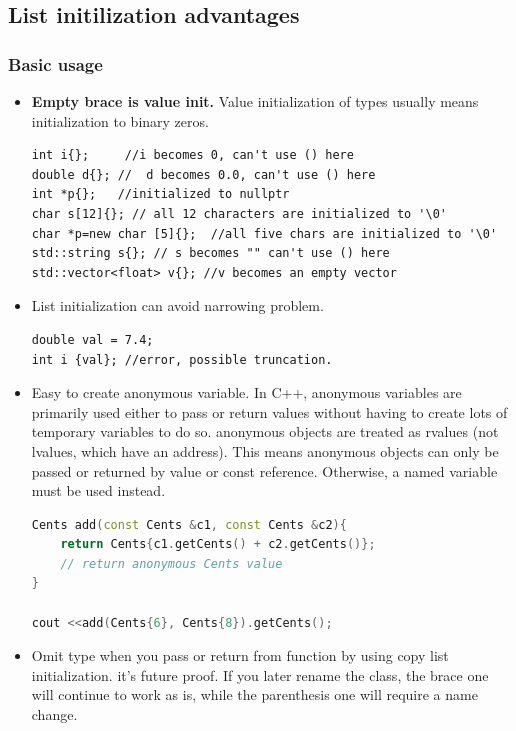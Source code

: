 \documentclass[a4paper,11pt,twoside]{book}
\begin{document}
\subsection{List initilization advantages}
			 

\subsubsection{Basic usage}
\begin{itemize}
	
	 \item \textbf{Empty brace is value init.} Value initialization of types usually means initialization to binary zeros.
\begin{lstlisting}[numbers = none]
int i{};     //i becomes 0, can't use () here         
double d{}; //  d becomes 0.0, can't use () here        
int *p{};   //initialized to nullptr
char s[12]{}; // all 12 characters are initialized to '\0'
char *p=new char [5]{};  //all five chars are initialized to '\0'		
std::string s{}; // s becomes "" can't use () here  
std::vector<float> v{}; //v becomes an empty vector
\end{lstlisting}

    \item List initialization can avoid narrowing problem.
\begin{lstlisting}[numbers=none]
double val = 7.4;
int i {val}; //error, possible truncation.
\end{lstlisting}

    \item Easy to create anonymous variable. In C++, anonymous variables are primarily used either to pass or return values without having to create lots of temporary variables to do so. anonymous objects are treated as rvalues (not lvalues, which have an address). This means anonymous objects can only be passed or returned by value or const reference. Otherwise, a named variable must be used instead.

\begin{lstlisting}[frame=single, language=c++]
Cents add(const Cents &c1, const Cents &c2){
	return Cents{c1.getCents() + c2.getCents()};
	// return anonymous Cents value
}

cout <<add(Cents{6}, Cents{8}).getCents();
\end{lstlisting}

    \item Omit type when you pass or return from function by using copy list initialization. it's future proof. If you later rename the class, the brace one will continue to work as is, while the parenthesis one will require a name change.


\end{itemize}
\end{document}
